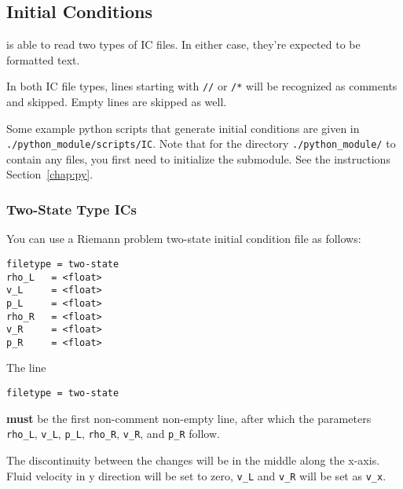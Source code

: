 \subsection{Initial Conditions}\label{chap:icfile}



\hydro is able to read two types of IC files. In either case, they're expected
to be formatted text.

In both IC file types, lines starting with \texttt{//} or \texttt{/*} will be
recognized as comments and skipped. Empty lines are skipped as well.

Some example python scripts that generate initial conditions are given in
\verb|./python_module/scripts/IC|. Note that for the directory
\verb|./python_module/| to contain any files, you first need to initialize the
submodule. See the instructions Section~\ref{chap:py}.







\subsubsection{Two-State Type ICs}\label{chap:twostate-ic}

You can use a Riemann problem two-state initial condition file as follows:

\begin{lstlisting}
filetype = two-state
rho_L   = <float>
v_L     = <float>
p_L     = <float>
rho_R   = <float>
v_R     = <float>
p_R     = <float>
\end{lstlisting}

The line

\begin{lstlisting}
filetype = two-state
\end{lstlisting}

\textbf{must} be the first non-comment non-empty line, after which the
parameters \texttt{rho\_L}, \texttt{v\_L}, \texttt{p\_L}, \texttt{rho\_R},
\texttt{v\_R}, and \texttt{p\_R} follow.

The discontinuity between the changes will be in the middle along the x-axis.
Fluid velocity in y direction will be set to zero, \texttt{v\_L} and
\texttt{v\_R} will be set as \texttt{v\_x}.

